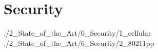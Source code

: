 \section{Security}
{./2_State_of_the_Art/6_Security/1_cellular}
{./2_State_of_the_Art/6_Security/2_80211pp}